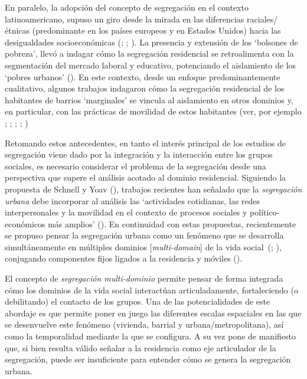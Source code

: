 \documentclass[
  spanish,
  a4paper,%
  chapterprefix=true,%
  DIV=calc,%
  twoside]{scrbook}%
\begin{document}
En paralelo, la adopción del concepto de segregación en el contexto
latinoamericano, supuso un giro desde la mirada en las diferencias
raciales/étnicas (predominante en los países europeos y en Estados
Unidos) hacia las desigualdades socioeconómicas (; ; ). La presencia y extensión de los `bolsones de
pobreza', llevó a indagar cómo la segregación residencial se
retroalimenta con la segmentación del mercado laboral y educativo,
potenciando el aislamiento de los `pobres urbanos' (). En
este contexto, desde un enfoque predominantemente cualitativo, algunos
trabajos indagaron cómo la segregación residencial de los habitantes de
barrios `marginales' se vincula al aislamiento en otros dominios y, en
particular, con las prácticas de movilidad de estos habitantes (ver, por
ejemplo ; ; ; ; )

Retomando estos antecedentes, en tanto el interés principal de los
estudios de segregación viene dado por la integración y la interacción
entre los grupos sociales, es necesario considerar el problema de la
segregación desde una perspectiva que supere el análisis acotado al
dominio residencial. Siguiendo la propuesta de Schnell y Yoav
(), trabajos recientes han señalado que la \emph{segregación
urbana} debe incorporar al análisis las `actividades cotidianas, las
redes interpersonales y la movilidad en el contexto de procesos sociales
y político-económicos más amplios' (). En
continuidad con estas propuestas, recientemente se propuso pensar la
segregación urbana como un fenómeno que se desarrolla simultáneamente en
múltiples dominios {[}\emph{multi-domain}{]} de la vida social~(; ), conjugando componentes fijos ligados a la residencia y
móviles ().

El concepto de \emph{segregación multi-dominio} permite pensar de forma
integrada cómo los dominios de la vida social interactúan
articuladamente, fortaleciendo (o debilitando) el contacto de los
grupos. Una de las potencialidades de este abordaje es que permite poner
en juego las diferentes escalas espaciales en las que se desenvuelve
este fenómeno (vivienda, barrial y urbana/metropolitana), así como la
temporalidad mediante la que se configura. A su vez pone de manifiesto
que, si bien resulta válido señalar a la residencia como eje articulador
de la segregación, puede ser insuficiente para entender cómo se genera
la segregación urbana.
\end{document}
